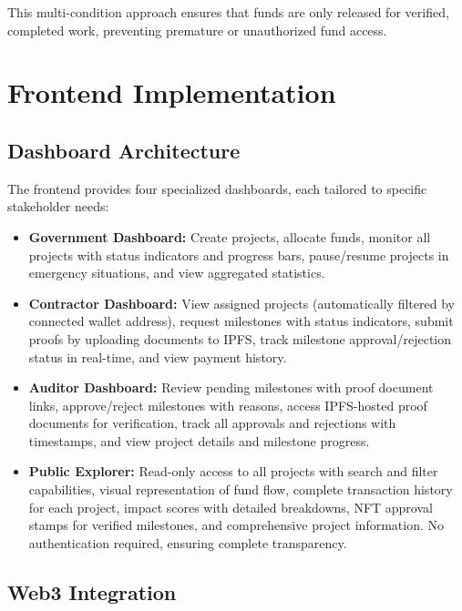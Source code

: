 \documentclass[12pt,a4wide]{report}
\theoremstyle{plain}
\theoremstyle{definition}
\theoremstyle{remark}
\begin{document}
This multi-condition approach ensures that funds are only released for verified, completed work, preventing premature or unauthorized fund access.

\section{Frontend Implementation}

\subsection{Dashboard Architecture}

The frontend provides four specialized dashboards, each tailored to specific stakeholder needs:

\begin{itemize}
    \item \textbf{Government Dashboard:} Create projects, allocate funds, monitor all projects with status indicators and progress bars, pause/resume projects in emergency situations, and view aggregated statistics.
    
    \item \textbf{Contractor Dashboard:} View assigned projects (automatically filtered by connected wallet address), request milestones with status indicators, submit proofs by uploading documents to IPFS, track milestone approval/rejection status in real-time, and view payment history.
    
    \item \textbf{Auditor Dashboard:} Review pending milestones with proof document links, approve/reject milestones with reasons, access IPFS-hosted proof documents for verification, track all approvals and rejections with timestamps, and view project details and milestone progress.
    
    \item \textbf{Public Explorer:} Read-only access to all projects with search and filter capabilities, visual representation of fund flow, complete transaction history for each project, impact scores with detailed breakdowns, NFT approval stamps for verified milestones, and comprehensive project information. No authentication required, ensuring complete transparency.
\end{itemize}

\subsection{Web3 Integration}
\end{document}
